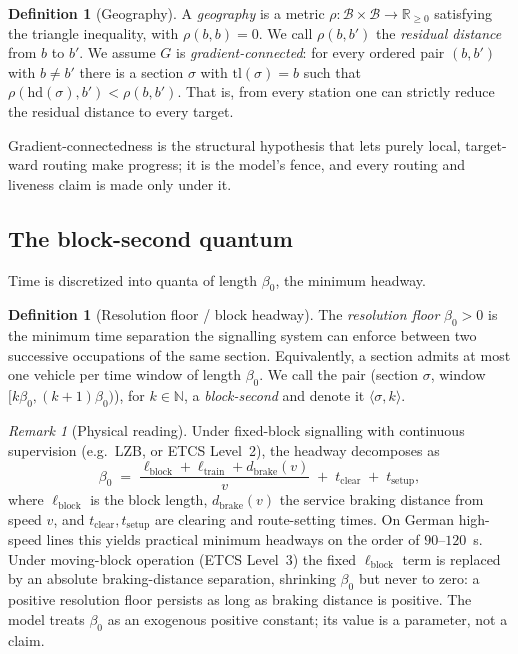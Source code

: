 \documentclass[11pt,twocolumn,a4paper]{article}
\theoremstyle{definition}
\newtheorem{definition}[theorem]{Definition}
\theoremstyle{remark}
\newtheorem{remark}[theorem]{Remark}
\newcommand{\Rnn}{\mathbb{R}_{\geq 0}}
\newcommand{\N}{\mathbb{N}}
\newcommand{\blocktime}{\beta_0}
\newcommand{\stations}{\mathcal{B}}
\begin{document}
\begin{definition}[Geography]
\label{def:geo}
A \emph{geography} is a metric $\rho:\stations\times\stations\to\Rnn$ satisfying the triangle inequality, with $\rho(b,b)=0$. We call $\rho(b,b')$ the \emph{residual distance} from $b$ to $b'$. We assume $G$ is \emph{gradient-connected}: for every ordered pair $(b,b')$ with $b\neq b'$ there is a section $\sigma$ with $\mathrm{tl}(\sigma)=b$ such that $\rho(\mathrm{hd}(\sigma),b') < \rho(b,b')$. That is, from every station one can strictly reduce the residual distance to every target.
\end{definition}

Gradient-connectedness is the structural hypothesis that lets purely local, target-ward routing make progress; it is the model's fence, and every routing and liveness claim is made only under it.

\subsection{The block-second quantum}

Time is discretized into quanta of length $\blocktime$, the minimum headway.

\begin{definition}[Resolution floor / block headway]
\label{def:headway}
The \emph{resolution floor} $\blocktime > 0$ is the minimum time separation the signalling system can enforce between two successive occupations of the same section. Equivalently, a section admits at most one vehicle per time window of length $\blocktime$. We call the pair (section $\sigma$, window $[k\blocktime,(k+1)\blocktime)$), for $k\in\N$, a \emph{block-second} and denote it $\langle \sigma, k\rangle$.
\end{definition}

\begin{remark}[Physical reading]
\label{rem:headway_physical}
Under fixed-block signalling with continuous supervision (e.g.\ LZB, or ETCS Level~2), the headway decomposes as
\begin{equation}
\blocktime \;=\; \frac{\ell_{\mathrm{block}} + \ell_{\mathrm{train}} + d_{\mathrm{brake}}(v)}{v} \;+\; t_{\mathrm{clear}} \;+\; t_{\mathrm{setup}},
\end{equation}
where $\ell_{\mathrm{block}}$ is the block length, $d_{\mathrm{brake}}(v)$ the service braking distance from speed $v$, and $t_{\mathrm{clear}},t_{\mathrm{setup}}$ are clearing and route-setting times. On German high-speed lines this yields practical minimum headways on the order of $90$--$120$~s. Under moving-block operation (ETCS Level~3) the fixed $\ell_{\mathrm{block}}$ term is replaced by an absolute braking-distance separation, shrinking $\blocktime$ but never to zero: a positive resolution floor persists as long as braking distance is positive. The model treats $\blocktime$ as an exogenous positive constant; its value is a parameter, not a claim.
\end{remark}
\end{document}
